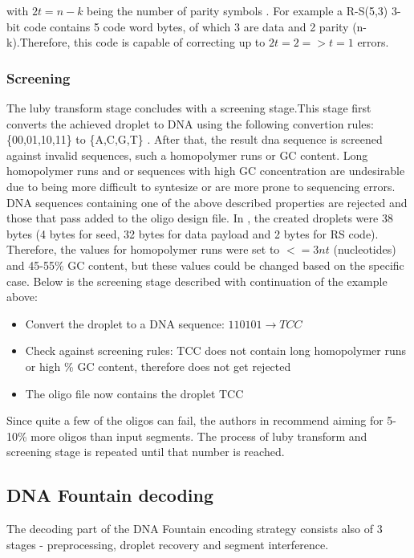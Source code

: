 \documentclass[12pt]%
{article}
\begin{document}
with $2t = n - k$ being the number of parity symbols \cite{sklar2001reed}. For example a R-S(5,3) 3-bit code  contains 5 code word bytes, of which 3 are data and 2 parity (n-k).Therefore, this code is capable of correcting up to $2t=2   => t = 1$ errors.


\subsubsection{Screening}
The luby transform stage concludes with a screening stage.This stage first converts the achieved droplet to DNA using the following convertion rules: \{00,01,10,11\} to \{A,C,G,T\} \cite{erlich2017dnasupplementary}. After that, the result dna sequence is screened against invalid sequences, such a homopolymer runs or GC content. Long homopolymer runs and or sequences with high GC concentration are undesirable \cite{erlich2017dna} due to being more difficult to syntesize or are more prone to sequencing errors. DNA sequences containing one of the above described properties are rejected and those that pass added to the oligo design file. In \cite{erlich2017dna}, the created droplets were 38 bytes (4 bytes for seed, 32 bytes for data payload and 2 bytes for RS code). Therefore, the values for homopolymer runs were set to \(<= 3 nt \) (nucleotides) and 45-55\% GC content, but these values could be changed based on the specific case. Below is the screening stage described with continuation of the example above:

\begin{itemize}
\item Convert the droplet to a DNA sequence: $110101 \rightarrow TCC$
\item Check against screening rules: TCC does not contain long homopolymer runs or high \% GC content, therefore does not get rejected
\item The oligo file now contains the droplet TCC
\end{itemize}

Since quite a few of the oligos can fail, the authors in \cite{erlich2017dna} recommend aiming for 5-10\% more oligos than input segments. The process of luby transform and screening stage is repeated until that number is reached. 

\newpage
\subsection{DNA Fountain decoding}

The decoding part of the DNA Fountain encoding strategy consists also of 3 stages - preprocessing, droplet recovery and segment interference.
\end{document}

